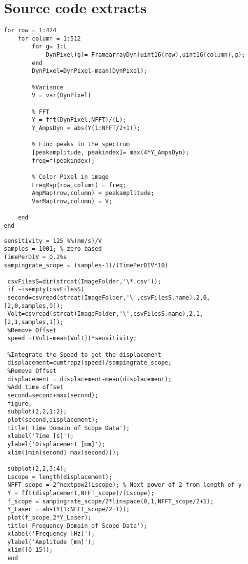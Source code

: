 \section{Source code extracts}\label{app:sourcecode}
\begin{lstlisting}[caption={Creation of variance,amplitude and frequency images},label={list:FFT}]
% FFT and variance
for row = 1:424
	for column = 1:512
		for g= 1:L
			DynPixel(g)= FramearrayDyn(uint16(row),uint16(column),g); 
		end
		DynPixel=DynPixel-mean(DynPixel);
		
		%Variance
		V = var(DynPixel) 
		
		% FFT
		Y = fft(DynPixel,NFFT)/(L);
		Y_AmpsDyn = abs(Y(1:NFFT/2+1));
		
		% Find peaks in the spectrum
		[peakamplitude, peakindex]= max(4*Y_AmpsDyn);
		freq=f(peakindex);
	
		% Color Pixel in image
		FreqMap(row,column) = freq;
		AmpMap(row,column) = peakamplitude;
		VarMap(row,column) = V;
		
   	end
end
\end{lstlisting}

\newpage 
\begin{lstlisting}[caption={Evaluation of LDV data from scope},label={list:LDV_FFT}]
% Scope and Laser Doppler Vibrometer Data
sensitivity = 125 %%(mm/s)/V
samples = 1001; % zero based
TimePerDIV = 0.2%s
sampingrate_scope = (samples-1)/(TimePerDIV*10) 

 csvFilesS=dir(strcat(ImageFolder,'\*.csv'));
 if ~isempty(csvFilesS)
 second=csvread(strcat(ImageFolder,'\',csvFilesS.name),2,0,[2,0,samples,0]);
 Volt=csvread(strcat(ImageFolder,'\',csvFilesS.name),2,1,[2,1,samples,1]);
 %Remove Offset
 speed =(Volt-mean(Volt))*sensitivity;

 %Integrate the Speed to get the displacement
 displacement=cumtrapz(speed)/sampingrate_scope;
 %Remove Offset
 displacement = displacement-mean(displacement);
 %Add time offset
 second=second+max(second);
 figure; 
 subplot(2,2,1:2);
 plot(second,displacement);
 title('Time Domain of Scope Data');
 xlabel('Time [s]');
 ylabel('Displacement [mm]');
 xlim([min(second) max(second)]);
 
 subplot(2,2,3:4);
 Lscope = length(displacement);
 NFFT_scope = 2^nextpow2(Lscope); % Next power of 2 from length of y 
 Y = fft(displacement,NFFT_scope)/(Lscope);
 f_scope = sampingrate_scope/2*linspace(0,1,NFFT_scope/2+1);
 Y_Laser = abs(Y(1:NFFT_scope/2+1));
 plot(f_scope,2*Y_Laser);
 title('Frequency Domain of Scope Data');
 xlabel('Frequency [Hz]');
 ylabel('Amplitude [mm]');
 xlim([0 15]);
 end
 \end{lstlisting}
